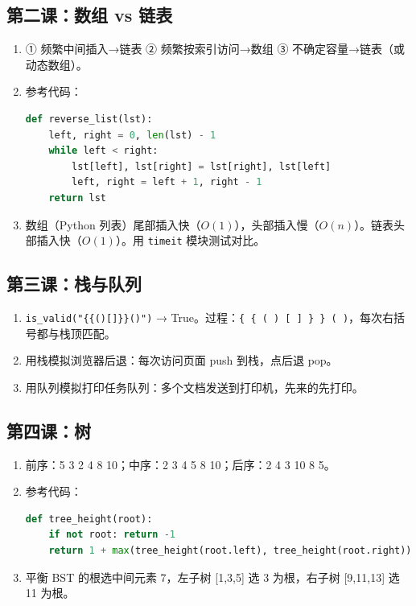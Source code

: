 \documentclass[a4paper,12pt]{ctexart}
\begin{document}
\subsection*{第二课：数组 vs 链表}
\begin{enumerate}
  \item ① 频繁中间插入→链表 ② 频繁按索引访问→数组 ③ 不确定容量→链表（或动态数组）。
  \item 参考代码：
\begin{lstlisting}[language=Python]
def reverse_list(lst):
    left, right = 0, len(lst) - 1
    while left < right:
        lst[left], lst[right] = lst[right], lst[left]
        left, right = left + 1, right - 1
    return lst
\end{lstlisting}
  \item 数组（Python 列表）尾部插入快（$O(1)$），头部插入慢（$O(n)$）。链表头部插入快（$O(1)$）。用 \texttt{timeit} 模块测试对比。
\end{enumerate}

\subsection*{第三课：栈与队列}
\begin{enumerate}
  \item \texttt{is\_valid("\{\{()[]\}\}()")} → True。过程：\texttt{\{ \{ ( ) [ ] \} \} ( )}，每次右括号都与栈顶匹配。
  \item 用栈模拟浏览器后退：每次访问页面 push 到栈，点后退 pop。
  \item 用队列模拟打印任务队列：多个文档发送到打印机，先来的先打印。
\end{enumerate}

\subsection*{第四课：树}
\begin{enumerate}
  \item 前序：5 3 2 4 8 10；中序：2 3 4 5 8 10；后序：2 4 3 10 8 5。
  \item 参考代码：
\begin{lstlisting}[language=Python]
def tree_height(root):
    if not root: return -1
    return 1 + max(tree_height(root.left), tree_height(root.right))
\end{lstlisting}
  \item 平衡 BST 的根选中间元素 7，左子树 [1,3,5] 选 3 为根，右子树 [9,11,13] 选 11 为根。
\end{enumerate}
\end{document}
